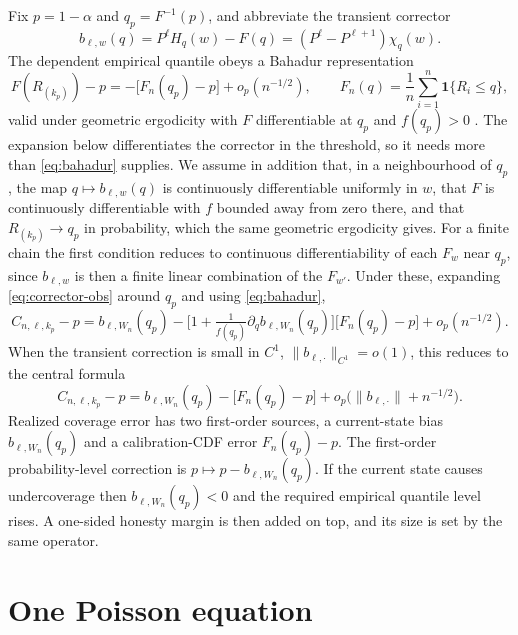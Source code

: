 \documentclass[11pt]{article}
\theoremstyle{definition}
\theoremstyle{remark}
\newcommand{\one}{\mathbf{1}}
\begin{document}
Fix $p=1-\alpha$ and $q_p=F^{-1}(p)$, and abbreviate the transient corrector
\begin{equation}\label{eq:bias}
  b_{\ell,w}(q) = P^{\ell}H_q(w) - F(q) = (P^{\ell}-P^{\ell+1})\chi_q(w) .
\end{equation}
The dependent empirical quantile obeys a Bahadur representation
\begin{equation}\label{eq:bahadur}
  F(R_{(k_p)}) - p = -\big[F_n(q_p) - p\big] + o_p(n^{-1/2}),
  \qquad F_n(q) = \frac1n\sum_{i=1}^n \one\{R_i\le q\},
\end{equation}
valid under geometric ergodicity with $F$ differentiable at $q_p$ and $f(q_p)>0$
\citep{glynn2002quantile}. The expansion below differentiates the corrector in the threshold, so
it needs more than \eqref{eq:bahadur} supplies. We assume in addition that, in a neighbourhood of
$q_p$, the map $q\mapsto b_{\ell,w}(q)$ is continuously differentiable uniformly in $w$, that $F$ is
continuously differentiable with $f$ bounded away from zero there, and that
$R_{(k_p)}\to q_p$ in probability, which the same geometric ergodicity gives. For a finite chain
the first condition reduces to continuous differentiability of each $F_w$ near $q_p$, since
$b_{\ell,w}$ is then a finite linear combination of the $F_{w'}$. Under these, expanding
\eqref{eq:corrector-obs} around $q_p$ and using \eqref{eq:bahadur},
\begin{equation}\label{eq:expansion}
  C_{n,\ell,k_p} - p
  = b_{\ell,W_n}(q_p)
    - \Big[1 + \tfrac{1}{f(q_p)}\partial_q b_{\ell,W_n}(q_p)\Big]\big[F_n(q_p)-p\big]
    + o_p(n^{-1/2}).
\end{equation}
When the transient correction is small in $C^1$, $\|b_{\ell,\cdot}\|_{C^1}=o(1)$, this reduces
to the central formula
\begin{equation}\label{eq:central}
  C_{n,\ell,k_p} - p = b_{\ell,W_n}(q_p) - \big[F_n(q_p)-p\big]
    + o_p\big(\|b_{\ell,\cdot}\| + n^{-1/2}\big) .
\end{equation}
Realized coverage error has two first-order sources, a current-state bias $b_{\ell,W_n}(q_p)$
and a calibration-CDF error $F_n(q_p)-p$. The first-order probability-level correction is
$p\mapsto p-b_{\ell,W_n}(q_p)$. If the current state causes undercoverage then
$b_{\ell,W_n}(q_p)<0$ and the required empirical quantile level rises. A one-sided honesty
margin is then added on top, and its size is set by the same operator.

\section{One Poisson equation}\label{sec:onepoisson}
\end{document}
